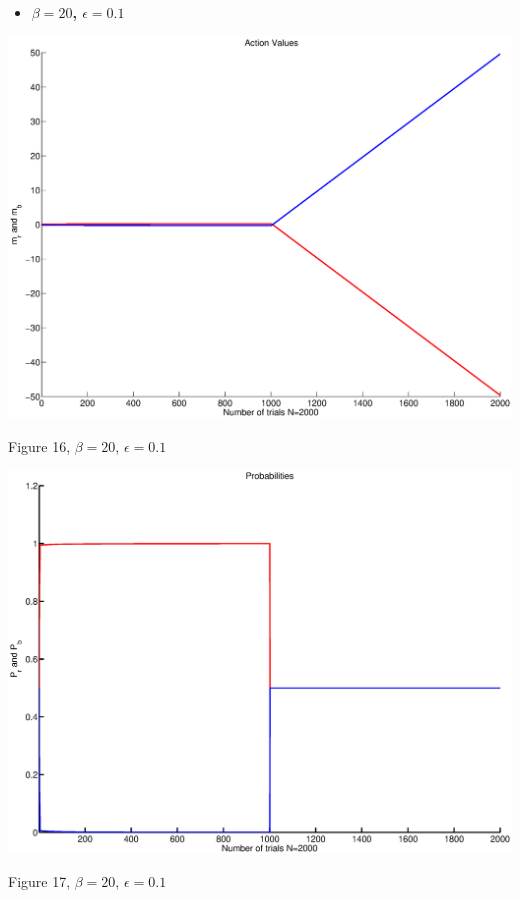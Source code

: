 \documentclass{article}
\begin{document}
\newpage
\begin{itemize}
 \item \textbf{ $\beta=20$, $\epsilon=0.1$}
\end{itemize}

\begin{center}
\includegraphics[width=\textwidth]{d_action2.eps}
\begin{footnotesize}
 Figure 16, $\beta=20$, $\epsilon=0.1$
\end{footnotesize}
\end{center}

\begin{center}
\includegraphics[width=\textwidth]{d_prob2.eps}
\begin{footnotesize}
 Figure 17, $\beta=20$, $\epsilon=0.1$
\end{footnotesize}
\end{center}
\end{document}
